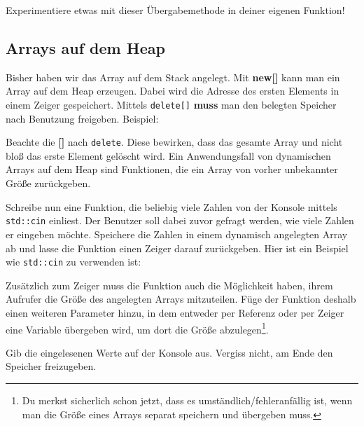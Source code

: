 
Experimentiere etwas mit dieser Übergabemethode in deiner eigenen Funktion!

\subsection{Arrays auf dem Heap}
Bisher haben wir das Array auf dem Stack angelegt.
Mit \textbf{new[]} kann man ein Array auf dem Heap erzeugen.
Dabei wird die Adresse des ersten Elements in einem Zeiger gespeichert.
Mittels \lstinline{delete[]} \textbf{muss} man den belegten Speicher nach Benutzung freigeben.
Beispiel:


Beachte die \textbf{[]} nach \lstinline{delete}.
Diese bewirken, dass das gesamte Array und nicht bloß das erste Element gelöscht wird.
Ein Anwendungsfall von dynamischen Arrays auf dem Heap sind Funktionen, die ein Array von vorher unbekannter Größe zurückgeben.

Schreibe nun eine Funktion, die beliebig viele Zahlen von der Konsole mittels \lstinline{std::cin} einliest.
Der Benutzer soll dabei zuvor gefragt werden, wie viele Zahlen er eingeben möchte.
Speichere die Zahlen in einem dynamisch angelegten Array ab und lasse die Funktion einen Zeiger darauf zurückgeben.
Hier ist ein Beispiel wie \lstinline{std::cin} zu verwenden ist:


Zusätzlich zum Zeiger muss die Funktion auch die Möglichkeit haben, ihrem Aufrufer die Größe des angelegten Arrays mitzuteilen.
Füge der Funktion deshalb einen weiteren Parameter hinzu, in dem entweder per Referenz oder per Zeiger eine Variable übergeben wird, um dort die Größe abzulegen\footnote{Du merkst sicherlich schon jetzt, dass es umständlich/fehleranfällig ist, wenn man die Größe eines Arrays separat speichern und übergeben muss.}.

Gib die eingelesenen Werte auf der Konsole aus.
Vergiss nicht, am Ende den Speicher freizugeben.
